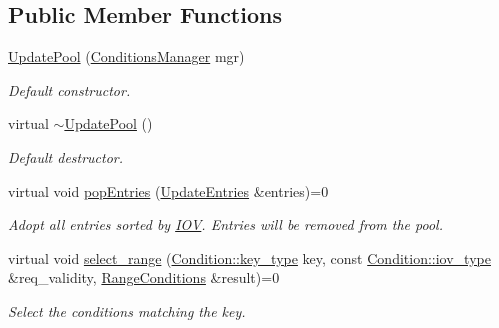 \subsection*{Public Member Functions}
\begin{DoxyCompactItemize}
\item 
\hyperlink{class_d_d4hep_1_1_conditions_1_1_update_pool_a906a53034c9d5f71194f1f0e0e0a82d2}{UpdatePool} (\hyperlink{class_d_d4hep_1_1_conditions_1_1_conditions_manager}{ConditionsManager} mgr)
\begin{DoxyCompactList}\small\item\em Default constructor. \item\end{DoxyCompactList}\item 
virtual \hyperlink{class_d_d4hep_1_1_conditions_1_1_update_pool_a6f6e54abf8c2d19be9166686fcd51215}{$\sim$UpdatePool} ()
\begin{DoxyCompactList}\small\item\em Default destructor. \item\end{DoxyCompactList}\item 
virtual void \hyperlink{class_d_d4hep_1_1_conditions_1_1_update_pool_aeb7494e79ae47538aa4f6ca2cb7c4b4d}{popEntries} (\hyperlink{class_d_d4hep_1_1_conditions_1_1_update_pool_a1a578a7a025ded412da474be106dc780}{UpdateEntries} \&entries)=0
\begin{DoxyCompactList}\small\item\em Adopt all entries sorted by \hyperlink{class_d_d4hep_1_1_i_o_v}{IOV}. Entries will be removed from the pool. \item\end{DoxyCompactList}\item 
virtual void \hyperlink{class_d_d4hep_1_1_conditions_1_1_update_pool_a3cd5432ff682a8da5c9402814a1bd995}{select\_\-range} (\hyperlink{class_d_d4hep_1_1_conditions_1_1_condition_a7528efa762e8cc072ef80ea67c3531f9}{Condition::key\_\-type} key, const \hyperlink{class_d_d4hep_1_1_i_o_v}{Condition::iov\_\-type} \&req\_\-validity, \hyperlink{namespace_d_d4hep_1_1_conditions_ae765f0140a33973a430280f02b6062f4}{RangeConditions} \&result)=0
\begin{DoxyCompactList}\small\item\em Select the conditions matching the key. \item\end{DoxyCompactList}\end{DoxyCompactItemize}


